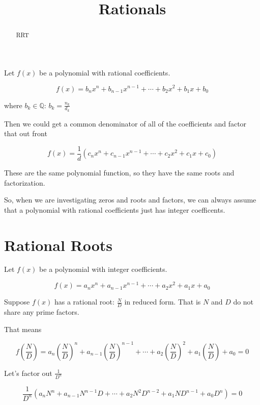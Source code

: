 \documentclass{ximera}
\title{Rationals}
\begin{document}
\begin{abstract}
RRT
\end{abstract}
\maketitle




Let $f(x)$ be a polynomial with rational coefficients.

\[   f(x) = b_n x^n + b_{n-1} x^{n-1} + \cdots + b_2 x^2 + b_1 x + b_0     \]


where $b_k \in \mathbb{Q}$:  $b_k = \frac{n_k}{d_k}$


Then we could get a common denominator of all of the coefficients and factor that out front



\[   f(x) = \frac{1}{d}(c_n x^n + c_{n-1} x^{n-1} + \cdots + c_2 x^2 + c_1 x + c_0)    \]


These are the same polynomial function, so they have the same roots and factorization.


So, when we are investigating zeros and roots and factors, we can always assume that a polynomial with rational coefficients just has integer coefficents.




\section{Rational Roots}

Let $f(x)$ be a polynomial with integer coefficients.

\[   f(x) = a_n x^n + a_{n-1} x^{n-1} + \cdots + a_2 x^2 + a_1 x + a_0     \]


Suppose $f(x)$ has a rational root:  $\frac{N}{D}$ in reduced form.  That is $N$ and $D$ do not share any prime factors.



That means


\[    f \left( \frac{N}{D} \right) = a_n \left( \frac{N}{D} \right)^n + a_{n-1} \left( \frac{N}{D} \right)^{n-1} + \cdots + a_2 \left( \frac{N}{D} \right)^2 + a_1 \left( \frac{N}{D} \right) + a_0  = 0       \]


Let's factor out $\frac{1}{D^n}$





\[   \frac{1}{D^n} (a_n N^n + a_{n-1} N^{n-1} D + \cdots + a_2 N^2 D^{n-2}+ a_1 N D^{n-1} + a_0 D^n)  = 0       \]
\end{document}
